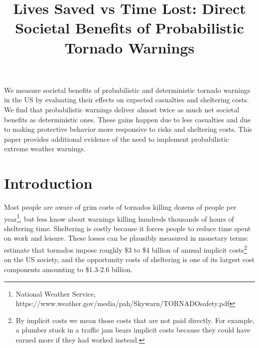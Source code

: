 \documentclass{ametsocV6.1}
\title{Lives Saved vs Time Lost: Direct Societal Benefits of Probabilistic Tornado Warnings}
\affiliation{\aff{a}{University of Oklahoma, CIMMS}}
\begin{document}
\maketitle

%
%
%
\statement
	We measure societal benefits of probabilistic and deterministic tornado warnings in the US by evaluating their effects on expected casualties and sheltering costs. We find that probabilistic warnings deliver almost twice as much net societal benefits as deterministic ones. These gains happen due to less casualties and due to making protective behavior more responsive to risks and sheltering costs.  This paper provides additional evidence of the need to implement probabilistic extreme weather warnings.
%
% 


%
\section{Introduction}

Most people are aware of grim costs of tornados killing dozens of people per year\footnote{National Weather Service, https://www.weather.gov/media/pah/Skywarn/TORNADOsafety.pdf}, but less know about warnings killing hundreds thousands of hours of sheltering time.  Sheltering is costly because it forces people to reduce time spent on work and leisure. These losses can be plausibly measured in monetary terms: \citet{simmons_economic_2013} estimate that tornados impose roughly \$3 to \$4 billion of annual implicit costs\footnote{By implicit costs we mean those costs that are not paid directly. For example, a plumber stuck in a traffic jam bears implicit costs because they could have earned more if they had worked instead.} on the US society, and the opportunity costs of sheltering is one of its largest cost components amounting to \$1.3-2.6 billion.
\end{document}
